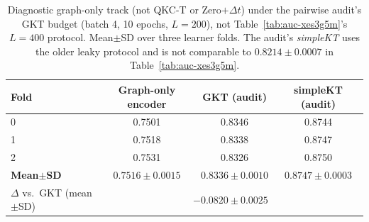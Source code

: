\begin{table}[H]
\caption{Diagnostic graph-only track (not QKC-T or Zero$+\Delta t$)
under the pairwise audit's GKT budget (batch 4, 10 epochs, $L{=}200$), not
Table~\ref{tab:auc-xes3g5m}'s $L{=}400$ protocol. Mean$\pm$SD over
three learner folds. The audit's \textit{simpleKT} uses the older leaky protocol
and is not comparable to $0.8214{\pm}0.0007$ in
Table~\ref{tab:auc-xes3g5m}.}
\label{tab:auc-xes3g5m-v2}
\centering
\scriptsize
\setlength{\tabcolsep}{3pt}
\begin{tabular}{@{}lccc@{}}
\toprule
Fold & Graph-only encoder & GKT (audit) & simpleKT (audit) \\
\midrule
0 & 0.7501 & 0.8346 & 0.8744 \\
1 & 0.7518 & 0.8338 & 0.8747 \\
2 & 0.7531 & 0.8326 & 0.8750 \\
\textbf{Mean$\pm$SD} & $\mathbf{0.7516{\pm}0.0015}$ & $\mathbf{0.8336{\pm}0.0010}$ & $\mathbf{0.8747{\pm}0.0003}$ \\
$\Delta$ vs.\ GKT (mean$\pm$SD) & \multicolumn{3}{c}{$-0.0820{\pm}0.0025$} \\
\bottomrule
\end{tabular}
\end{table}
